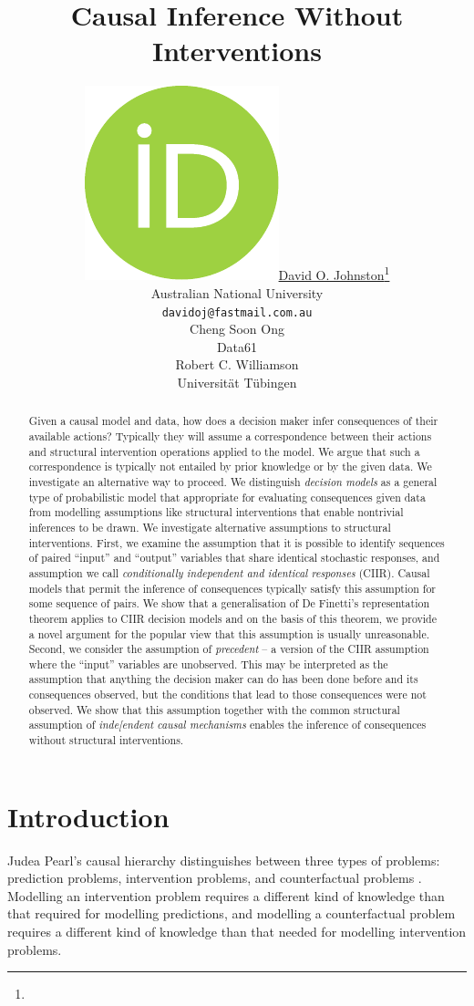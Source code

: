 \documentclass{article}
\author{ \href{https://orcid.org/0000-0003-3122-9767}{\includegraphics[scale=0.06]{orcid.pdf}\hspace{1mm}David O. Johnston}\thanks{} \\
  Australian National University \\
  \texttt{davidoj@fastmail.com.au}\\
  \And
  Cheng Soon Ong \\
  Data61\\
  \And
  Robert C. Williamson \\
  Universität Tübingen \\
}
\begin{document}
 

\title{Causal Inference Without Interventions}

\maketitle

\begin{abstract}
{Given a causal model and data, how does a decision maker infer consequences of their available actions? Typically they will assume a correspondence between their actions and structural intervention operations applied to the model. We argue that such a correspondence is typically not entailed by prior knowledge or by the given data. We investigate an alternative way to proceed. We distinguish \emph{decision models} as a general type of probabilistic model that appropriate for evaluating consequences given data from modelling assumptions like structural interventions that enable nontrivial inferences to be drawn. We investigate alternative assumptions to structural interventions. First, we examine the assumption that it is possible to identify sequences of paired ``input'' and ``output'' variables that share identical stochastic responses, and assumption we call \emph{conditionally independent and identical responses} (CIIR). Causal models that permit the inference of consequences typically satisfy this assumption for some sequence of pairs. We show that a generalisation of De Finetti's representation theorem applies to CIIR decision models and on the basis of this theorem, we provide a novel argument for the popular view that this assumption is usually unreasonable. Second, we consider the assumption of \emph{precedent} -- a version of the CIIR assumption where the ``input'' variables are unobserved. This may be interpreted as the assumption that anything the decision maker can do has been done before and its consequences observed, but the conditions that lead to those consequences were not observed. We show that this assumption together with the common structural assumption of \emph{inde[endent causal mechanisms} enables the inference of consequences without structural interventions.}
\end{abstract}


\section{Introduction}

Judea Pearl's causal hierarchy distinguishes between three types of problems: prediction problems, intervention problems, and counterfactual problems \citep{pearl_book_2018}. Modelling an intervention problem requires a different kind of knowledge than that required for modelling predictions, and modelling a counterfactual problem requires a different kind of knowledge than that needed for modelling intervention problems.
\end{document}
